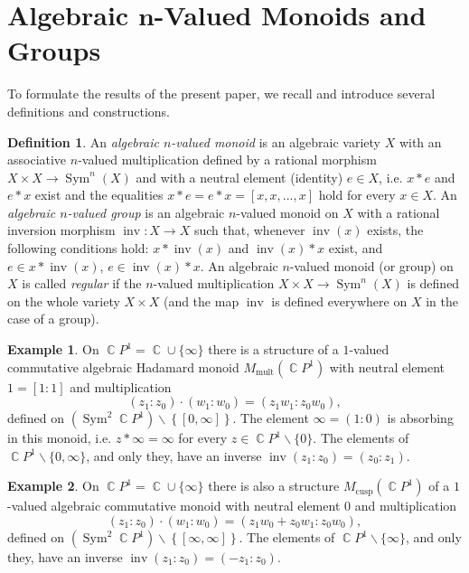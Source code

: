 \documentclass[14pt, dvipsnames]{extarticle}
\theoremstyle{plain}
\theoremstyle{definition}
\newtheorem{defi}{Definition}
\newtheorem{example}{\bf Example}
\theoremstyle{remark}
\DeclareMathOperator{\Sym}{\mathrm{Sym}}
\DeclareMathOperator{\inv}{\mathrm{inv}}
\DeclareMathOperator{\Cc}{\mathbb{C}}
\DeclareMathOperator{\mult}{\mathrm{mult}}
\DeclareMathOperator{\cusp}{\mathrm{cusp}}
\begin{document}
\section
[Algebraic $\texorpdfstring{\boldsymbol{n}}{n}$-Valued Monoids and Groups]
{Algebraic $\boldsymbol{n}$-Valued Monoids and Groups}
\label{algebraic_nval_monoids_and_groups}

To formulate the results of the present paper, we recall and introduce several definitions and constructions.

\begin{defi}\label{def_1}
{An {\it algebraic $n$-valued monoid} is an algebraic variety $X$ with an associative $n$-valued multiplication defined by a rational morphism $X\times X\to \Sym^n(X)$ and with a neutral element (identity) $e\in X$, i.e. $x\ast e$ and $e\ast x$ exist and the equalities $x\ast e = e\ast x = [x, x, ..., x]$ hold for every $x\in X$. An {\it algebraic $n$-valued group} is an algebraic $n$-valued monoid on $X$ with a rational inversion morphism $\inv: X\to X$ such that, whenever $\inv(x)$ exists, the following conditions hold: $x\ast\inv(x)$ and $\inv(x)\ast x$ exist, and $e\in x\ast\inv(x)$, $e\in \inv(x)\ast x$. An algebraic $n$-valued monoid (or group) on $X$ is called {\it regular} if the $n$-valued multiplication $X\times X\to \Sym^n(X)$ is defined on the whole variety $X\times X$ (and the map $\inv$ is defined everywhere on $X$ in the case of a group).} 
\end{defi}  

\begin{example}\label{example_1}
On $\Cc\!P^1 = \Cc\cup\{\infty\}$ there is a structure of a $1$-valued commutative algebraic Hadamard monoid $M_{\mult}(\Cc\!P^1)$ with neutral element $1 = [1:1]$ and multiplication
$$(z_1:z_0)\cdot (w_1:w_0) = (z_1w_1:z_0w_0),$$
defined on $(\Sym^2\Cc\!P^1)\backslash\left\{[0, \infty]\right\}$. The element $\infty = (1: 0)$ is absorbing in this monoid, i.e. $z\ast\infty = \infty$ for every $z\in\Cc\!P^1\backslash\{0\}$. The elements of $\Cc\!P^1\backslash\{0, \infty\}$, and only they, have an inverse $\inv (z_1:z_0) = (z_0:z_1)$.
\end{example}

\begin{example}\label{example_cusp}
On $\Cc\!P^1 = \Cc\cup\{\infty\}$ there is also a structure $M_{\cusp}(\Cc\!P^1)$ of a $1$-valued algebraic commutative monoid with neutral element $0$ and multiplication
$$(z_1:z_0)\cdot(w_1:w_0) = (z_1w_0 + z_0w_1: z_0w_0),$$
defined on $(\Sym^2\Cc\!P^1)\backslash\left\{[\infty, \infty]\right\}$. The elements of $\Cc\!P^1\backslash\{\infty\}$, and only they, have an inverse $\inv (z_1:z_0) = (-z_1:z_0)$. 
\end{example}
\end{document}
